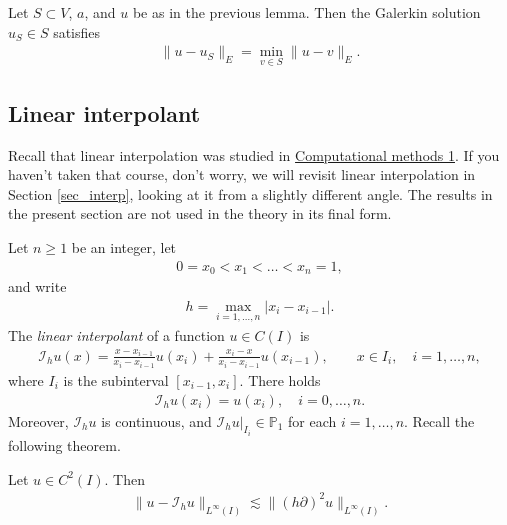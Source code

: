 \documentclass[12pt,oneside,final]{amsart}
\def\I{\mathcal I}
\begin{document}
\begin{corollary}\label{cor_abs_err}
Let $S \subset V$, $a$, and $u$ be as in the previous lemma. 
Then the Galerkin solution $u_S \in S$ satisfies
    \begin{align*}
\|u-u_S\|_E = \min_{v \in S} \|u - v\|_E.
    \end{align*}
\end{corollary}

\subsection{Linear interpolant}

Recall that linear interpolation was studied in \href{https://github.com/uh-comp-methods1/notebooks/blob/main/interpolation/lecture.ipynb}{Computational methods 1}. If you haven't taken that course, don't worry, we will revisit linear interpolation in Section \ref{sec_interp}, looking at it from a slightly different angle. The results in the present section are not used in the theory in its final form. 

Let $n \ge 1$ be an integer, let 
    \begin{align}\label{def_mesh}
0 = x_0 < x_1 < \dots < x_n = 1,
    \end{align}
and write
    \begin{align}\label{def_mesh_size}
h = \max_{i=1,\dots,n} |x_i - x_{i-1}|.
    \end{align}
The {\em linear interpolant} of a function $u \in C(I)$ is 
    \begin{align*}
\I_h u(x) = \frac{x - x_{i-1}}{x_i - x_{i-1}} u(x_i) + \frac{x_{i} - x}{x_i - x_{i-1}} u(x_{i-1}), \qquad x \in I_i, \quad i = 1,\dots,n,
    \end{align*}
where $I_i$ is the subinterval $[x_{i-1}, x_i]$.
There holds 
    \begin{align*}
\I_h u(x_i) = u(x_i), \quad i=0,\dots,n.
    \end{align*}
Moreover, $\I_h u$ is continuous, and $\I_h u|_{I_i} \in \mathbb P_1$ for each $i=1,\dots,n$. 
Recall the following theorem.

\begin{theorem}
Let $u \in C^2(I)$. Then 
    \begin{align*}
\|u - \I_h u\|_{L^\infty(I)} \lesssim \|(h \partial)^2 u\|_{L^\infty(I)}.
    \end{align*}
\end{theorem}
\end{document}
